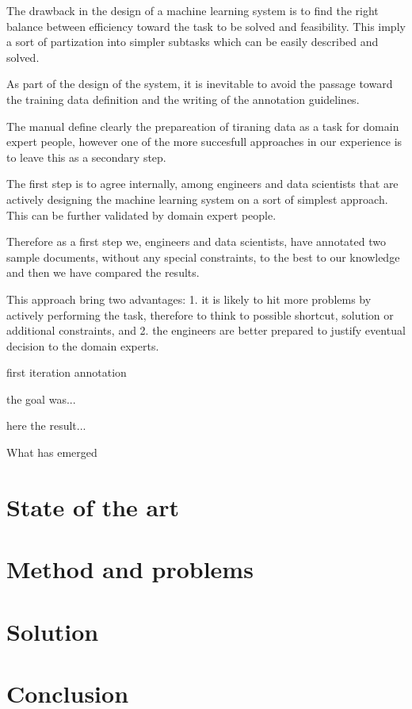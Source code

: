 \documentclass{article}
\begin{document}
The drawback in the design of a machine learning system is to find the right balance between efficiency toward the task to be solved and feasibility. This imply a sort of partization into simpler subtasks which can be easily described and solved. 

As part of the design of the system, it is inevitable to avoid the passage toward the training data definition and the writing of the annotation guidelines. 

The manual define clearly the prepareation of tiraning data as a task for domain expert people, however one of the more succesfull approaches in our experience is to leave this as a secondary step. 

The first step is to agree internally, among engineers and data scientists that are actively designing the machine learning system on a sort of simplest approach. This can be further validated by domain expert people. 

Therefore as a first step we, engineers and data scientists, have annotated two sample documents, without any special constraints, to the best to our knowledge and then we have compared the results. 

This approach bring two advantages: 1. it is likely to hit more problems by actively performing the task, therefore to think to possible shortcut, solution or additional constraints, and 2. the engineers are better prepared to justify eventual decision to the domain experts. 

first iteration annotation

the goal was... 

here the result...


What has emerged



\section{State of the art} 

\section{Method and problems}

\section{Solution}

\section{Conclusion}

\listoffigures



\end{document}
